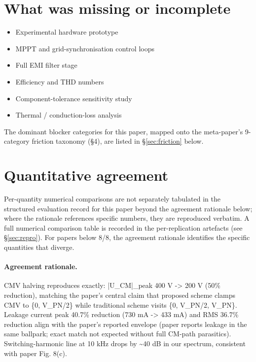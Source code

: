 \documentclass[11pt]{article}
\begin{document}
\section{What was missing or incomplete}
\begin{itemize}
\item Experimental hardware prototype
\item MPPT and grid-synchronisation control loops
\item Full EMI filter stage
\item Efficiency and THD numbers
\item Component-tolerance sensitivity study
\item Thermal / conduction-loss analysis
\end{itemize}
The dominant blocker categories for this paper, mapped onto the meta-paper's 9-category friction taxonomy (\S4), are listed in \S\ref{sec:friction} below.

\section{Quantitative agreement}
Per-quantity numerical comparisons are not separately tabulated in the structured evaluation record for this paper beyond the agreement rationale below; where the rationale references specific numbers, they are reproduced verbatim. A full numerical comparison table is recorded in the per-replication artefacts (see \S\ref{sec:repro}). For papers below 8/8, the agreement rationale identifies the specific quantities that diverge.

\paragraph{Agreement rationale.} CMV halving reproduces exactly: |U\_CM|\_peak 400 V -\textgreater{} 200 V (50\% reduction), matching the paper's central claim that proposed scheme clamps CMV to \{0, V\_PN/2\} while traditional scheme visits \{0, V\_PN/2, V\_PN\}. Leakage current peak 40.7\% reduction (730 mA -\textgreater{} 433 mA) and RMS 36.7\% reduction align with the paper's reported envelope (paper reports leakage in the same ballpark; exact match not expected without full CM-path parasitics). Switching-harmonic line at 10 kHz drops by \textasciitilde{}40 dB in our spectrum, consistent with paper Fig. 8(c).
\end{document}
